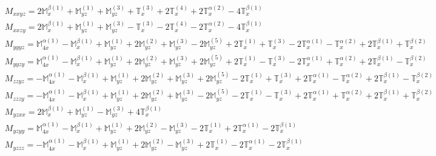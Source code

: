 \documentclass[fleqn,8pt,landscape]{jsarticle}
\begin{document}
\begin{align*}
& M_{xxyz} = 2 \mathbb{M}_{x}^{\beta(1)} + \mathbb{M}_{yz}^{(1)} + \mathbb{M}_{yz}^{(3)} + \mathbb{T}_{x}^{(3)} + 2 \mathbb{T}_{x}^{(4)} + 2 \mathbb{T}_{x}^{\alpha(2)} - 4 \mathbb{T}_{x}^{\beta(1)} \\
& M_{xxzy} = 2 \mathbb{M}_{x}^{\beta(1)} + \mathbb{M}_{yz}^{(1)} + \mathbb{M}_{yz}^{(3)} - \mathbb{T}_{x}^{(3)} - 2 \mathbb{T}_{x}^{(4)} - 2 \mathbb{T}_{x}^{\alpha(2)} - 4 \mathbb{T}_{x}^{\beta(1)} \\
& M_{yyyz} = \mathbb{M}_{4x}^{\alpha(1)} - \mathbb{M}_{x}^{\beta(1)} + \mathbb{M}_{yz}^{(1)} + 2 \mathbb{M}_{yz}^{(2)} + \mathbb{M}_{yz}^{(3)} - 2 \mathbb{M}_{yz}^{(5)} + 2 \mathbb{T}_{x}^{(1)} + \mathbb{T}_{x}^{(3)} - 2 \mathbb{T}_{x}^{\alpha(1)} - \mathbb{T}_{x}^{\alpha(2)} + 2 \mathbb{T}_{x}^{\beta(1)} + \mathbb{T}_{x}^{\beta(2)} \\
& M_{yyzy} = \mathbb{M}_{4x}^{\alpha(1)} - \mathbb{M}_{x}^{\beta(1)} + \mathbb{M}_{yz}^{(1)} + 2 \mathbb{M}_{yz}^{(2)} + \mathbb{M}_{yz}^{(3)} + 2 \mathbb{M}_{yz}^{(5)} + 2 \mathbb{T}_{x}^{(1)} - \mathbb{T}_{x}^{(3)} - 2 \mathbb{T}_{x}^{\alpha(1)} + \mathbb{T}_{x}^{\alpha(2)} + 2 \mathbb{T}_{x}^{\beta(1)} - \mathbb{T}_{x}^{\beta(2)} \\
& M_{zzyz} = - \mathbb{M}_{4x}^{\alpha(1)} - \mathbb{M}_{x}^{\beta(1)} + \mathbb{M}_{yz}^{(1)} + 2 \mathbb{M}_{yz}^{(2)} + \mathbb{M}_{yz}^{(3)} + 2 \mathbb{M}_{yz}^{(5)} - 2 \mathbb{T}_{x}^{(1)} + \mathbb{T}_{x}^{(3)} + 2 \mathbb{T}_{x}^{\alpha(1)} - \mathbb{T}_{x}^{\alpha(2)} + 2 \mathbb{T}_{x}^{\beta(1)} - \mathbb{T}_{x}^{\beta(2)} \\
& M_{zzzy} = - \mathbb{M}_{4x}^{\alpha(1)} - \mathbb{M}_{x}^{\beta(1)} + \mathbb{M}_{yz}^{(1)} + 2 \mathbb{M}_{yz}^{(2)} + \mathbb{M}_{yz}^{(3)} - 2 \mathbb{M}_{yz}^{(5)} - 2 \mathbb{T}_{x}^{(1)} - \mathbb{T}_{x}^{(3)} + 2 \mathbb{T}_{x}^{\alpha(1)} + \mathbb{T}_{x}^{\alpha(2)} + 2 \mathbb{T}_{x}^{\beta(1)} + \mathbb{T}_{x}^{\beta(2)} \\
& M_{yzxx} = 2 \mathbb{M}_{x}^{\beta(1)} + \mathbb{M}_{yz}^{(1)} - \mathbb{M}_{yz}^{(3)} + 4 \mathbb{T}_{x}^{\beta(1)} \\
& M_{yzyy} = \mathbb{M}_{4x}^{\alpha(1)} - \mathbb{M}_{x}^{\beta(1)} + \mathbb{M}_{yz}^{(1)} + 2 \mathbb{M}_{yz}^{(2)} - \mathbb{M}_{yz}^{(3)} - 2 \mathbb{T}_{x}^{(1)} + 2 \mathbb{T}_{x}^{\alpha(1)} - 2 \mathbb{T}_{x}^{\beta(1)} \\
& M_{yzzz} = - \mathbb{M}_{4x}^{\alpha(1)} - \mathbb{M}_{x}^{\beta(1)} + \mathbb{M}_{yz}^{(1)} + 2 \mathbb{M}_{yz}^{(2)} - \mathbb{M}_{yz}^{(3)} + 2 \mathbb{T}_{x}^{(1)} - 2 \mathbb{T}_{x}^{\alpha(1)} - 2 \mathbb{T}_{x}^{\beta(1)} \\

\end{align*}
\end{document}
